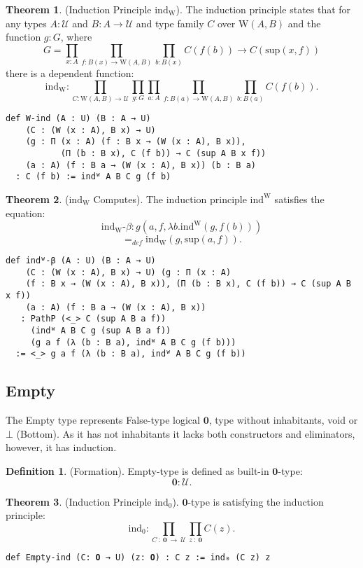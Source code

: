 \documentclass{article}
\theoremstyle{definition}
\newtheorem{theorem}{Theorem}
\newtheorem{definition}{Definition}
\begin{document}
\begin{theorem} (Induction Principle $\mathrm{ind_W}$).
The induction principle states that for any types $A: \mathcal{U}$
and $B: A \rightarrow \mathcal{U}$ and type family $C$ over $\mathrm{W}(A,B)$
and the function $g : G$, where
$$
  G = \prod_{x: A}\prod_{f: B(x) → \mathrm{W}(A,B)}\prod_{b: B(x)} C(f(b)) → C(\mathrm{sup}(x,f))
$$
there is a dependent function:
$$
   \mathrm{ind_W} : \prod_{C: \mathrm{W}(A,B) → \mathcal{U}}\prod_{g:G}\prod_{a: A}\prod_{f: B(a) → \mathrm{W}(A,B)}\prod_{b: B(a)}C(f(b)).
$$
\begin{lstlisting}
def W-ind (A : U) (B : A → U)
    (C : (W (x : A), B x) → U)
    (g : Π (x : A) (f : B x → (W (x : A), B x)),
           (Π (b : B x), C (f b)) → C (sup A B x f))
    (a : A) (f : B a → (W (x : A), B x)) (b : B a)
  : C (f b) := indᵂ A B C g (f b)
\end{lstlisting}
\end{theorem}

\begin{theorem}($\mathrm{ind_W}$ Computes).
The induction principle $\mathrm{ind^W}$ satisfies the equation:
$$
\mathrm{ind_W}\mbox{-}\beta : g(a,f,\lambda b.\mathrm{ind^W}(g,f(b))) 
$$
$$
  =_{def} \mathrm{ind_W}(g,\mathrm{sup}(a,f)).
$$
\begin{lstlisting}
def indᵂ-β (A : U) (B : A → U)
    (C : (W (x : A), B x) → U) (g : Π (x : A)
    (f : B x → (W (x : A), B x)), (Π (b : B x), C (f b)) → C (sup A B x f))
    (a : A) (f : B a → (W (x : A), B x))
   : PathP (<_> C (sup A B a f))
     (indᵂ A B C g (sup A B a f))
     (g a f (λ (b : B a), indᵂ A B C g (f b)))
  := <_> g a f (λ (b : B a), indᵂ A B C g (f b))
\end{lstlisting}
\end{theorem}

\newpage
\subsection{Empty}

The Empty type represents False-type logical $\mathbf{0}$, type without inhabitants, void or $\bot$ (Bottom).
As it has not inhabitants it lacks both constructors and eliminators, however, it has induction.

\begin{definition} (Formation).
Empty-type is defined as built-in $\mathbf{0}$-type:
$$
 \mathbf{0} : \mathcal{U}.
$$
\end{definition}

\begin{theorem} (Induction Principle $\mathrm{ind_0}$).
$\mathbf{0}$-type is satisfying the induction principle:
$$
  \mathrm{ind_0} : \prod_{C\ :\ \mathbf{0}\ \rightarrow\ \mathcal{U}} \prod_{z\ :\ \mathbf{0}} C(z).
$$
\begin{lstlisting}
def Empty-ind (C: 𝟎 → U) (z: 𝟎) : C z := ind₀ (C z) z
\end{lstlisting}
\end{theorem}
\end{document}
